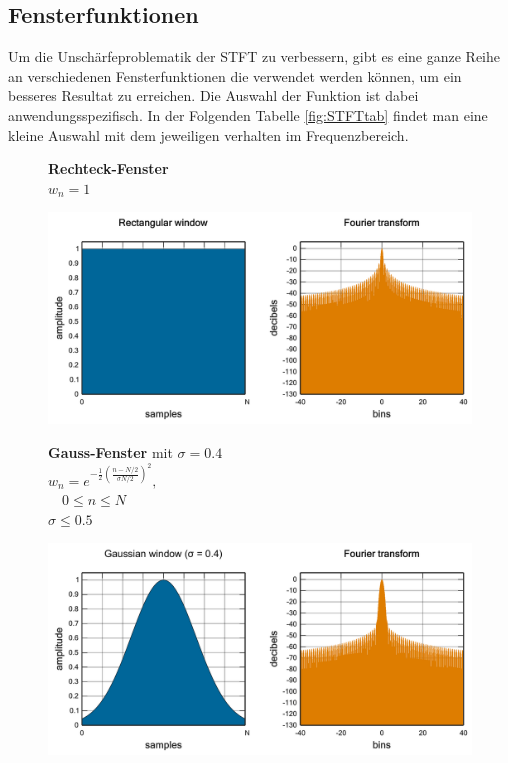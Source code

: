 \subsection{Fensterfunktionen}
Um die Unschärfeproblematik der STFT zu verbessern, gibt es eine ganze Reihe an verschiedenen Fensterfunktionen die verwendet werden können, um ein besseres Resultat zu erreichen. Die Auswahl der Funktion ist dabei anwendungsspezifisch. In der Folgenden Tabelle \ref{fig:STFTtab} findet man eine kleine Auswahl mit dem jeweiligen verhalten im Frequenzbereich. 


\begin{figure}[!ht]
	\begin{minipage}{.4\columnwidth}
		\textbf{Rechteck-Fenster}\\
		$w_{n}=1$
	\end{minipage}%
	\begin{minipage}{.6\columnwidth}
		\centering
		\includegraphics[width=\linewidth]{papers/autotune/sections/fft/images/windows/Rectangular.pdf}
	\end{minipage}


	\begin{minipage}{.4\columnwidth}
		\textbf{Gauss-Fenster} mit $\sigma = 0.4$\\
		$w_{n}=e^{-\frac{1}{2}\left(\frac{n-N / 2}{\sigma N / 2}\right)^{2}},$\\
		$ \quad 0 \leq n \leq N$\\
		$\sigma \leq 0.5$
	\end{minipage}%
	\begin{minipage}{.6\columnwidth}
		\centering
		\includegraphics[width=\linewidth]{papers/autotune/sections/fft/images/windows/Gauss.pdf}
	\end{minipage}



\end{figure}

